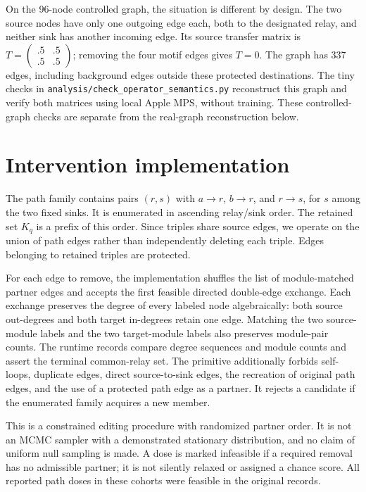 \documentclass[10pt,letterpaper]{article}
\begin{document}
On the 96-node controlled graph, the situation is different by design.
The two source nodes have only one outgoing edge each, both to the
designated relay, and neither sink has another incoming edge. Its source
transfer matrix is
$T=\left(\begin{smallmatrix}.5&.5\\.5&.5\end{smallmatrix}\right)$;
removing the four motif edges gives $T=0$. The graph has 337 edges,
including background edges outside these protected destinations. The
tiny checks in \texttt{analysis/check\_operator\_semantics.py} reconstruct
this graph and verify both matrices using local Apple MPS, without
training. These controlled-graph checks are separate from the real-graph reconstruction below.

\section{Intervention implementation}

The path family contains pairs $(r,s)$ with
$a\to r$, $b\to r$, and $r\to s$, for $s$ among the two fixed sinks.
It is enumerated in ascending relay/sink order. The retained set $K_q$
is a prefix of this order. Since triples share source edges, we operate
on the union of path edges rather than independently deleting each
triple. Edges belonging to retained triples are protected.

For each edge to remove, the implementation shuffles the list of
module-matched partner edges and accepts the first feasible directed
double-edge exchange. Each exchange preserves the degree of every
labeled node algebraically: both source out-degrees and both target
in-degrees retain one edge. Matching the two source-module labels and
the two target-module labels also preserves module-pair counts. The
runtime records compare degree sequences and module counts and assert
the terminal common-relay set. The primitive additionally forbids
self-loops, duplicate edges, direct source-to-sink edges, the recreation
of original path edges, and the use of a protected path edge as a partner.
It rejects a candidate if the enumerated family acquires a new member.

This is a constrained editing procedure with randomized partner order.
It is not an MCMC sampler with a demonstrated stationary distribution,
and no claim of uniform null sampling is made. A dose is marked
infeasible if a required removal has no admissible partner; it is not
silently relaxed or assigned a chance score. All reported path doses
in these cohorts were feasible in the original records.
\end{document}
